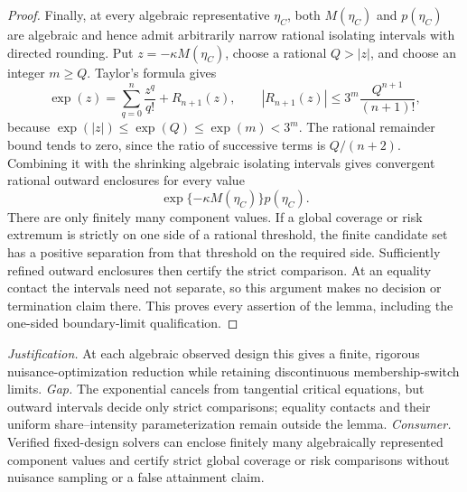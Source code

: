 \documentclass{article}
\begin{document}
\begin{proof}
Finally, at every algebraic representative \(\eta_C\), both \(M(\eta_C)\) and \(p(\eta_C)\) are algebraic and hence admit arbitrarily narrow rational isolating intervals with directed rounding.  Put \(z=-\kappa M(\eta_C)\), choose a rational \(Q>|z|\), and choose an integer \(m\ge Q\).  Taylor's formula gives
\[
 \exp(z)=\sum_{q=0}^{n}\frac{z^q}{q!}+R_{n+1}(z),
 \qquad
 |R_{n+1}(z)|
 \le 3^m\frac{Q^{n+1}}{(n+1)!},
\]
because \(\exp(|z|)\le\exp(Q)\le\exp(m)<3^m\).  The rational remainder bound tends to zero, since the ratio of successive terms is \(Q/(n+2)\).  Combining it with the shrinking algebraic isolating intervals gives convergent rational outward enclosures for every value
\[
 \exp\{-\kappa M(\eta_C)\}p(\eta_C).
\]
There are only finitely many component values.  If a global coverage or risk extremum is strictly on one side of a rational threshold, the finite candidate set has a positive separation from that threshold on the required side.  Sufficiently refined outward enclosures then certify the strict comparison.  At an equality contact the intervals need not separate, so this argument makes no decision or termination claim there.  This proves every assertion of the lemma, including the one-sided boundary-limit qualification.
\end{proof}
\par\smallskip\noindent \textit{Justification.} At each algebraic observed design this gives a finite, rigorous nuisance-optimization reduction while retaining discontinuous membership-switch limits. \textit{Gap.} The exponential cancels from tangential critical equations, but outward intervals decide only strict comparisons; equality contacts and their uniform share--intensity parameterization remain outside the lemma. \textit{Consumer.} Verified fixed-design solvers can enclose finitely many algebraically represented component values and certify strict global coverage or risk comparisons without nuisance sampling or a false attainment claim.
\end{document}
